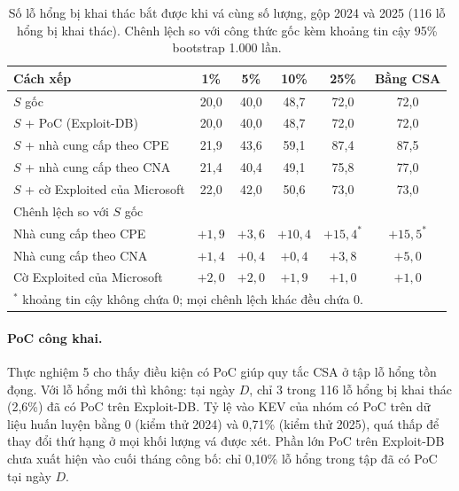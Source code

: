 \begin{table}
\centering
\caption{Số lỗ hổng bị khai thác bắt được khi vá cùng số lượng, gộp 2024 và 2025 (116 lỗ hổng
bị khai thác). Chênh lệch so với công thức gốc kèm khoảng tin cậy 95\% bootstrap 1.000 lần.}
\label{tab:khonghieuqua}
\begin{tabular}{lccccc}
\toprule
Cách xếp & 1\% & 5\% & 10\% & 25\% & Bằng CSA \\
\midrule
$S$ gốc & 20,0 & 40,0 & 48,7 & 72,0 & 72,0 \\
$S$ + PoC (Exploit-DB) & 20,0 & 40,0 & 48,7 & 72,0 & 72,0 \\
$S$ + nhà cung cấp theo CPE & 21,9 & 43,6 & 59,1 & 87,4 & 87,5 \\
$S$ + nhà cung cấp theo CNA & 21,4 & 40,4 & 49,1 & 75,8 & 77,0 \\
$S$ + cờ Exploited của Microsoft & 22,0 & 42,0 & 50,6 & 73,0 & 73,0 \\
\midrule
\multicolumn{6}{l}{Chênh lệch so với $S$ gốc} \\
\quad Nhà cung cấp theo CPE & $+1{,}9$ & $+3{,}6$ & $+10{,}4$ & $+15{,}4^{*}$ & $+15{,}5^{*}$ \\
\quad Nhà cung cấp theo CNA & $+1{,}4$ & $+0{,}4$ & $+0{,}4$ & $+3{,}8$ & $+5{,}0$ \\
\quad Cờ Exploited của Microsoft & $+2{,}0$ & $+2{,}0$ & $+1{,}9$ & $+1{,}0$ & $+1{,}0$ \\
\bottomrule
\multicolumn{6}{l}{\footnotesize $^{*}$ khoảng tin cậy không chứa 0; mọi chênh lệch khác đều chứa 0.}
\end{tabular}
\end{table}

\paragraph{PoC công khai.} Thực nghiệm 5 cho thấy điều kiện có PoC giúp quy tắc CSA ở tập lỗ hổng
tồn đọng. Với lỗ hổng mới thì không: tại ngày $D$, chỉ 3 trong 116 lỗ hổng bị khai thác (2,6\%)
đã có PoC trên Exploit-DB. Tỷ lệ vào KEV của nhóm có PoC trên dữ liệu huấn luyện bằng 0 (kiểm thử
2024) và 0,71\% (kiểm thử 2025), quá thấp để thay đổi thứ hạng ở mọi khối lượng vá được xét.
Phần lớn PoC trên Exploit-DB chưa xuất hiện vào cuối tháng công bố: chỉ 0,10\% lỗ hổng trong tập
đã có PoC tại ngày $D$.

